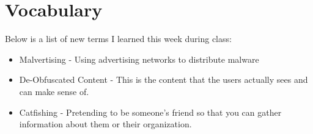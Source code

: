 \documentclass[letterpaper, onecolumn,10pt]{IEEEtran}
\begin{document}
                
                
            \section{Vocabulary}
            Below is a list of new terms I learned this week during class:
            \begin{itemize}
                \item Malvertising - Using advertising networks to distribute malware\\
                \item De-Obfuscated Content - This is the content that the users actually sees and can make sense of.\\
                \item Catfishing - Pretending to be someone's friend so that you can gather information about them or their organization.\\
            \end{itemize}
                
		
\end{document}
